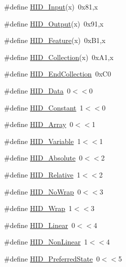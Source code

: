 \begin{DoxyCompactItemize}
\item 
\#define \hyperlink{group___u_s_b_d___h_i_d_ga272fc60a8ac573e1d6ed3e98d82c01ba}{H\+I\+D\+\_\+\+Input}(x)~0x81,x
\item 
\#define \hyperlink{group___u_s_b_d___h_i_d_gad36b2f5a9443ca22a590dcb6b5beb742}{H\+I\+D\+\_\+\+Output}(x)~0x91,x
\item 
\#define \hyperlink{group___u_s_b_d___h_i_d_gaf47ca0496105b0a4e660e128bea8a5f4}{H\+I\+D\+\_\+\+Feature}(x)~0x\+B1,x
\item 
\#define \hyperlink{group___u_s_b_d___h_i_d_ga28375bf547596810166888c44adb8855}{H\+I\+D\+\_\+\+Collection}(x)~0x\+A1,x
\item 
\#define \hyperlink{group___u_s_b_d___h_i_d_gabdeb55ecbe4e6774de16d7e73f14d1d4}{H\+I\+D\+\_\+\+End\+Collection}~0x\+C0
\item 
\#define \hyperlink{group___u_s_b_d___h_i_d_ga6fdf3aabdbd36deecb675ec299911862}{H\+I\+D\+\_\+\+Data}~0$<$$<$0
\item 
\#define \hyperlink{group___u_s_b_d___h_i_d_gaf565fe0a22495869e02aa47c45389eae}{H\+I\+D\+\_\+\+Constant}~1$<$$<$0
\item 
\#define \hyperlink{group___u_s_b_d___h_i_d_gaf374e658483a3a5dd41a69edf2215809}{H\+I\+D\+\_\+\+Array}~0$<$$<$1
\item 
\#define \hyperlink{group___u_s_b_d___h_i_d_ga10c7b1ae0313e8cba1251adb04f80f3e}{H\+I\+D\+\_\+\+Variable}~1$<$$<$1
\item 
\#define \hyperlink{group___u_s_b_d___h_i_d_ga22ca1d152685e6df172bed86e51039d4}{H\+I\+D\+\_\+\+Absolute}~0$<$$<$2
\item 
\#define \hyperlink{group___u_s_b_d___h_i_d_ga606c56b5542c71ccfa76ad2d955c353e}{H\+I\+D\+\_\+\+Relative}~1$<$$<$2
\item 
\#define \hyperlink{group___u_s_b_d___h_i_d_ga68c5d55e947b616e4d097c91060dc1ef}{H\+I\+D\+\_\+\+No\+Wrap}~0$<$$<$3
\item 
\#define \hyperlink{group___u_s_b_d___h_i_d_ga9e125d0a3fca1289a04eff6565a0c743}{H\+I\+D\+\_\+\+Wrap}~1$<$$<$3
\item 
\#define \hyperlink{group___u_s_b_d___h_i_d_gaf248dc18a9f36f57b92c045bae3a64f9}{H\+I\+D\+\_\+\+Linear}~0$<$$<$4
\item 
\#define \hyperlink{group___u_s_b_d___h_i_d_gac9f806072026e7c93b854e35c8fa42a5}{H\+I\+D\+\_\+\+Non\+Linear}~1$<$$<$4
\item 
\#define \hyperlink{group___u_s_b_d___h_i_d_gaebb57bff4cb3ff0125242403cb6badbe}{H\+I\+D\+\_\+\+Preferred\+State}~0$<$$<$5
$$
\end{DoxyCompactItemize}
